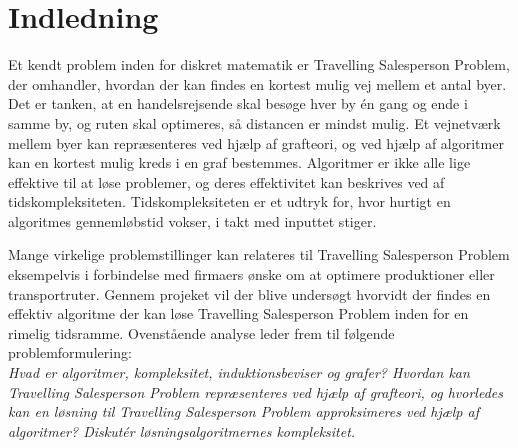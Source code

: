 \chapter{Indledning}
Et kendt problem inden for diskret matematik er Travelling Salesperson Problem, der omhandler, hvordan der kan findes en kortest mulig vej mellem et antal byer. 
Det er tanken, at en handelsrejsende skal besøge hver by én gang og ende i samme by, og ruten skal optimeres, så distancen er mindst mulig. 
Et vejnetværk mellem byer kan repræsenteres ved hjælp af grafteori, og ved hjælp af algoritmer kan en kortest mulig kreds i en graf bestemmes. 
Algoritmer er ikke alle lige effektive til at løse problemer, og deres effektivitet kan beskrives ved af tidskompleksiteten. 
Tidskompleksiteten er et udtryk for, hvor hurtigt en algoritmes gennemløbstid vokser, i takt med inputtet stiger. 

Mange virkelige problemstillinger kan relateres til Travelling Salesperson Problem eksempelvis i forbindelse med firmaers ønske om at optimere produktioner eller transportruter. 
Gennem projeket vil der blive undersøgt hvorvidt der findes en effektiv algoritme der kan løse Travelling Salesperson Problem inden for en rimelig tidsramme.
Ovenstående analyse leder frem til følgende problemformulering:\\

\textit{Hvad er algoritmer, kompleksitet, induktionsbeviser og grafer? Hvordan kan Travelling Salesperson Problem repræsenteres ved hjælp af grafteori, og hvorledes kan en løsning til Travelling Salesperson Problem approksimeres ved hjælp af algoritmer? Diskutér løsningsalgoritmernes kompleksitet.}
